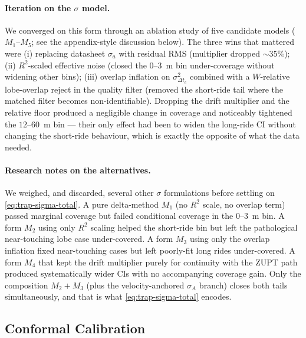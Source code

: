 \paragraph{Iteration on the $\sigma$ model.} We converged on this
form through an ablation study of five candidate models
($M_1$--$M_5$; see the appendix-style discussion below). The three
wins that mattered were
(i) replacing datasheet $\sigma_a$ with residual RMS
(multiplier dropped $\sim 35\%$);
(ii) $R^2$-scaled effective noise (closed the $0$--$3$~m bin
under-coverage without widening other bins);
(iii) overlap inflation on $\sigma_{\Delta t_c}^2$ combined with a
$W$-relative lobe-overlap reject in the quality filter (removed the
short-ride tail where the matched filter becomes non-identifiable).
Dropping the drift multiplier and the relative floor produced a
negligible change in coverage and noticeably tightened the $12$--$60$~m
bin — their only effect had been to widen the long-ride CI without
changing the short-ride behaviour, which is exactly the opposite of
what the data needed.

\paragraph{Research notes on the alternatives.} We weighed, and
discarded, several other $\sigma$ formulations before settling on
\eqref{eq:trap-sigma-total}. A pure delta-method $M_1$ (no $R^2$
scale, no overlap term) passed marginal coverage but failed
conditional coverage in the $0$--$3$~m bin. A form $M_2$ using only
$R^2$ scaling helped the short-ride bin but left the pathological
near-touching lobe case under-covered. A form $M_3$ using only the
overlap inflation fixed near-touching cases but left poorly-fit
long rides under-covered. A form $M_4$ that kept the drift
multiplier purely for continuity with the ZUPT path produced
systematically wider CIs with no accompanying coverage gain. Only the
composition $M_2 + M_3$ (plus the velocity-anchored $\sigma_A$
branch) closes both tails simultaneously, and that is what
\eqref{eq:trap-sigma-total} encodes.

\subsection{Conformal Calibration}
\label{sec:conformal-calibration}

